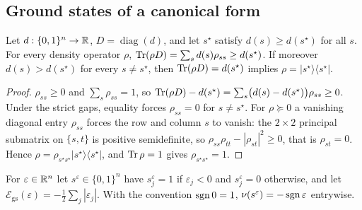\subsection{Ground states of a canonical form}
\label{sec:groundstate}

\begin{lemma}\label{lem:diag-min}
Let $d:\{0,1\}^n\to\mathbb R$, $D=\operatorname{diag}(d)$, and let $s^\star$ satisfy
$d(s)\geq d(s^\star)$ for all $s$. For every density operator $\rho$,
$\operatorname{Tr}(\rho D)=\sum_sd(s)\rho_{ss}\geq d(s^\star)$. If moreover $d(s)>d(s^\star)$ for every
$s\neq s^\star$, then $\operatorname{Tr}(\rho D)=d(s^\star)$ implies $\rho=|s^\star\rangle\langle s^\star|$.
\end{lemma}
\begin{proof}
$\rho_{ss}\geq0$ and $\sum_s\rho_{ss}=1$, so
$\operatorname{Tr}(\rho D)-d(s^\star)=\sum_s\bigl(d(s)-d(s^\star)\bigr)\rho_{ss}\geq0$. Under the strict
gaps, equality forces $\rho_{ss}=0$ for $s\neq s^\star$. For $\rho\succeq0$ a vanishing
diagonal entry $\rho_{ss}$ forces the row and column $s$ to vanish: the $2\times2$ principal
submatrix on $\{s,t\}$ is positive semidefinite, so $\rho_{ss}\rho_{tt}-|\rho_{st}|^2\geq0$,
that is $\rho_{st}=0$. Hence $\rho=\rho_{s^\star s^\star}|s^\star\rangle\langle s^\star|$, and
$\operatorname{Tr}\rho=1$ gives $\rho_{s^\star s^\star}=1$.
\end{proof}

\begin{definition}\label{def:ground}
For $\varepsilon\in\mathbb R^n$ let $s^\varepsilon\in\{0,1\}^n$ have $s^\varepsilon_j=1$ if
$\varepsilon_j<0$ and $s^\varepsilon_j=0$ otherwise, and let
$\mathcal E_{\mathrm{gs}}(\varepsilon)=-\tfrac12\sum_j|\varepsilon_j|$. With the convention $\operatorname{sgn}0=1$,
$\nu(s^\varepsilon)=-\operatorname{sgn}\varepsilon$ entrywise.
\end{definition}

